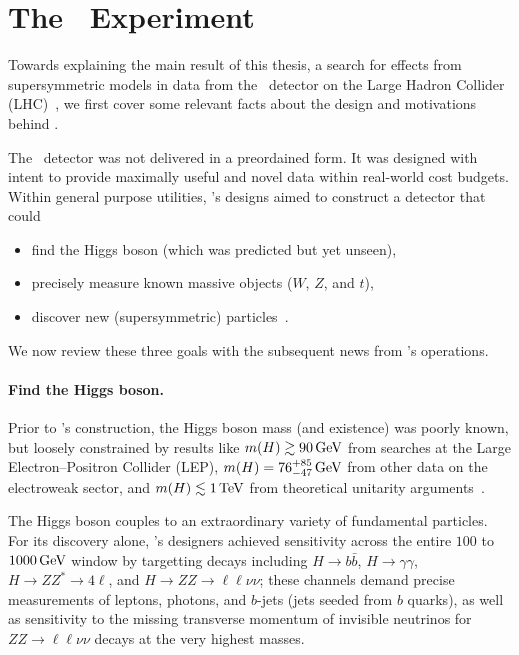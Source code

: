 \section{The \atlas\ Experiment}
\label{sec:context_atlas}
Towards explaining the main result of this thesis,
a search for effects from supersymmetric models
in data from the \atlas\ detector
on the Large Hadron Collider (LHC)~\cite{
atlas2022searches,
atlas2008experiment,
lhc2008machine
},
we first cover some relevant facts about the design and motivations
behind \atlas.

The \atlas\ detector was not delivered in a preordained form.
It was designed with intent to provide maximally useful and novel data within
real-world cost budgets.
Within general purpose utilities, \atlas's designs aimed to construct a
detector that could
\begin{itemize}
\item find the Higgs boson (which was predicted but yet unseen),
\item precisely measure known massive objects ($W$, $Z$, and $t$),
\item discover new (supersymmetric) particles~\cite{atlas1999design1}.
\end{itemize}
We now review these three goals with the subsequent news from \atlas's
operations.

\paragraph{Find the Higgs boson.}
Prior to \atlas's construction, the Higgs boson mass (and existence) was
poorly known, but loosely constrained by results like
$m(H) \gtrsim 90\,\eV[G]$ from searches at the
Large Electron–Positron Collider (LEP),
$m(H) = 76^{+85}_{-47}\,\eV[G]$ from other data on the electroweak sector,
and $m(H) \lesssim 1\,\eV[T]$ from theoretical unitarity arguments~\cite{
atlas1999design2,
ghinculov1998perturb,
lep1999ewk
}.

The Higgs boson couples to an extraordinary variety of fundamental particles.
For its discovery alone, \atlas's designers achieved sensitivity across the
entire $100$ to $1000\,\eV[G]$ window by targetting decays including
$H\to b\bar b$,
$H\to \gamma\gamma$,
$H\to ZZ^* \to 4\ell$, and
$H\to ZZ \to \ell\ell\nu\nu$;
these channels demand precise measurements of leptons, photons, and
$b$-jets (jets seeded from $b$ quarks), as well as sensitivity to the missing
transverse momentum of invisible neutrinos for $ZZ \to \ell\ell\nu\nu$ decays
at the very highest masses.

